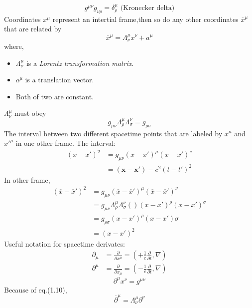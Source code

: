 \documentclass[12pt,a4paper]{article}
\numberwithin{equation}{subsection}
\begin{document}
$$
g^{\mu\nu}g_{\nu\rho}=\delta^\mu_\rho\text{ (Kronecker delta)}
$$
Coordinates $x^\mu$ represent an intertial frame,then so do any other
coordinates $\overline{x}^\mu$ that are related by 
\begin{equation}
\overline{x}^\mu=\Lambda^\mu_\nu x^\nu+a^\mu
\end{equation}
where,
\begin{itemize}
    \item $\Lambda^\mu_\nu$ is a \textit{Lorentz transformation matrix}.
    \item $a^\mu$ is a translation vector.
    \item Both of two are constant.
\end{itemize}
$\Lambda^\mu_\nu$ must obey 
\begin{equation}
g_{\mu\nu}\Lambda^\mu_\rho\Lambda^\nu_\sigma =g_{\rho\sigma}
\end{equation}
The interval between two different spacetime points that are labeled by
$x^\mu$ and $x'^\mu$ in one other frame.
The interval:
\begin{equation}
    \begin{aligned}
(x-x')^2&=g_{\mu\nu}(x-x')^\mu(x-x')^\nu\\
&=(\mathbf{x}-\mathbf{x}')-c^2(t-t')^2
    \end{aligned}
\end{equation}
In other frame,
\begin{equation}
    \begin{aligned}
    (\overline{x}-\overline{x}')^2 &= g_{\mu\nu}(\overline{x}-\overline{x}')^\mu(\overline{x}-\overline{x}')^\nu\\
    &=g_{\mu\nu}\Lambda^\mu_\rho\Lambda^\nu_\sigma()(x-x')^\rho(x-x')^\sigma\\
    &=g_{\rho\sigma}(x-x')^\rho(x-x')\sigma\\
    &=(x-x')^2
    \end{aligned}
\end{equation}
Useful notation for spacetime derivates:
\begin{align}
\partial_\mu &=\frac{\partial}{\partial x^\mu}=(+\frac{1}{c}\frac{\partial}{\partial t},\nabla)\\
\partial^\mu &=\frac{\partial}{\partial x_\mu}=(-\frac{1}{c}\frac{\partial}{\partial t},\nabla)
\end{align}
\begin{equation}
\partial^\mu x^\nu=g^{\mu\nu}
\end{equation}
Because of eq.(1.10),
\begin{equation}
\overline{\partial}^\mu=\Lambda^\mu_\nu\partial^\nu
\end{equation}
\end{document}
